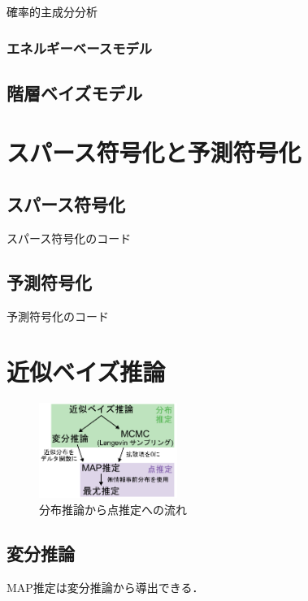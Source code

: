 \documentclass[titlepage]{ltjsbook}
\begin{document}
確率的主成分分析
\subsubsection{エネルギーベースモデル}

\subsection{階層ベイズモデル}

\section{スパース符号化と予測符号化}

\subsection{スパース符号化}


\begin{tcolorbox}
スパース符号化のコード
\end{tcolorbox}

\subsection{予測符号化}
\begin{tcolorbox}
予測符号化のコード
\end{tcolorbox}

\section{近似ベイズ推論}


\begin{figure}
  \centering
  \includegraphics[width=0.4\textwidth]{./figures/approx_bayesian.pdf}
  \caption{分布推論から点推定への流れ}
  \label{fig:approx_bayesian}
\end{figure}

\subsection{変分推論}
MAP推定は変分推論から導出できる．
\end{document}
